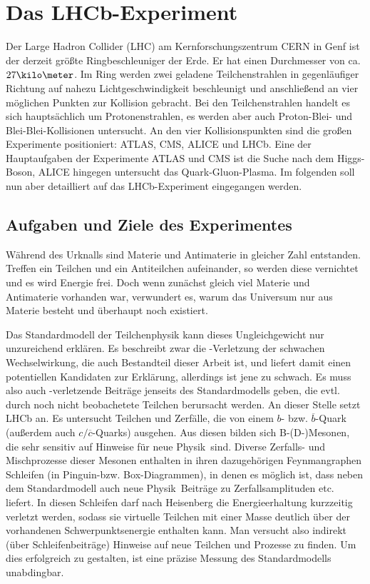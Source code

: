 \chapter{Das LHCb-Experiment}  \label{kap:experiment}
Der Large Hadron Collider (LHC) am Kernforschungszentrum CERN in Genf ist der derzeit größte Ringbeschleuniger der Erde. Er hat einen Durchmesser von ca. $27\kilo\meter$. Im Ring werden zwei geladene Teilchenstrahlen in gegenläufiger Richtung auf nahezu Lichtgeschwindigkeit beschleunigt und anschließend an vier möglichen Punkten zur Kollision gebracht. Bei den Teilchenstrahlen handelt es sich hauptsächlich um Protonenstrahlen, es werden aber auch Proton-Blei- und Blei-Blei-Kollisionen untersucht. An den vier Kollisionspunkten sind die großen Experimente positioniert: ATLAS, CMS, ALICE und LHCb. Eine der Hauptaufgaben der Experimente ATLAS und CMS ist die Suche nach dem Higgs-Boson, ALICE hingegen untersucht das Quark-Gluon-Plasma. Im folgenden soll nun aber detailliert auf das LHCb-Experiment eingegangen werden. \cite{lhc-info}

\section{Aufgaben und Ziele des Experimentes}
Während des Urknalls sind Materie und Antimaterie in gleicher Zahl entstanden. Treffen ein Teilchen und ein Antiteilchen aufeinander, so werden diese vernichtet und es wird Energie frei. Doch wenn zunächst gleich viel Materie und Antimaterie vorhanden war, verwundert es, warum das Universum nur aus Materie besteht und überhaupt noch existiert.

Das Standardmodell der Teilchenphysik kann dieses Ungleichgewicht nur unzureichend erklären. Es beschreibt zwar die \CP-Verletzung der schwachen Wechselwirkung, die auch Bestandteil dieser Arbeit ist, und liefert damit einen potentiellen Kandidaten zur Erklärung, allerdings ist jene zu schwach. Es muss also auch \CP-verletzende Beiträge jenseits des Standardmodells geben, die evtl. durch noch nicht beobachetete Teilchen berursacht werden. An dieser Stelle setzt LHCb an. Es untersucht Teilchen und Zerfälle, die von einem $b$- bzw. $\overline{b}$-Quark (außerdem auch $c/\overline{c}$-Quarks) ausgehen. Aus diesen bilden sich B-(D-)Mesonen, die sehr sensitiv auf Hinweise für \glqq neue Physik\grqq\ sind. Diverse Zerfalls- und Mischprozesse dieser Mesonen enthalten in ihren dazugehörigen Feynmangraphen Schleifen (in \glqq Pinguin-\grqq bzw. Box-Diagrammen), in denen es möglich ist, dass neben dem Standardmodell auch \glqq neue Physik\grqq\ Beiträge zu Zerfallsamplituden etc. liefert. In diesen Schleifen darf nach Heisenberg die Energieerhaltung kurzzeitig verletzt werden, sodass sie virtuelle Teilchen mit einer Masse deutlich über der vorhandenen Schwerpunktsenergie enthalten kann. Man versucht also indirekt (über Schleifenbeiträge) Hinweise auf neue Teilchen und Prozesse zu finden. Um dies erfolgreich zu gestalten, ist eine präzise Messung des Standardmodells unabdingbar. \cite{cern-courier, roadmap, lhcb-info}

